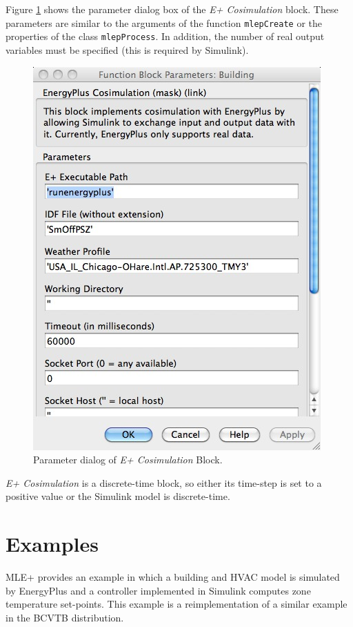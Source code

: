 \documentclass[11pt,letter]{article}
\newcommand{\MLEP}{MLE+\xspace}
\begin{document}
Figure \ref{fig:simblock-dlg} shows the parameter dialog box of the
\emph{E+ Cosimulation} block.  These parameters are similar
to the arguments of the function \verb+mlepCreate+ or the
properties of the class \verb+mlepProcess+.  In addition, the
number of real output variables must be specified (this is required by
Simulink).
\begin{figure}[tb]
\centering
\includegraphics[width=.5\linewidth]{graphics/slblockdlg.jpg}
\caption{\label{fig:simblock-dlg}Parameter dialog of \emph{E+ Cosimulation} Block.}
\end{figure}

\emph{E+ Cosimulation} is a discrete-time block, so either
its time-step is set to a positive value or the Simulink model is
discrete-time.


\section{Examples}
\label{sec:examples}

\MLEP provides an example in which a building and HVAC model is
simulated by EnergyPlus and a controller implemented in Simulink
computes zone temperature set-points.  This example is a
reimplementation of a similar example in the BCVTB distribution.
\end{document}
